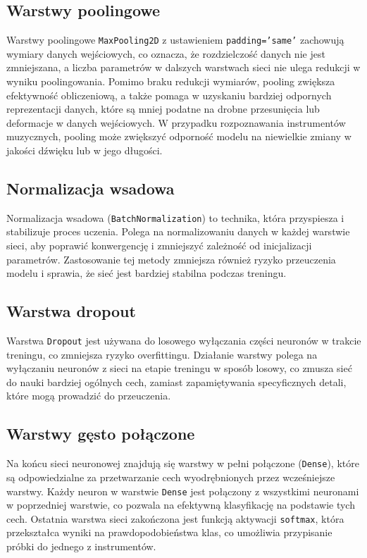 \documentclass{SGGW-thesis}
\begin{document}
\subsection{Warstwy poolingowe}
Warstwy poolingowe \texttt{MaxPooling2D} z ustawieniem \texttt{padding='same'} zachowują wymiary danych wejściowych, co oznacza, że rozdzielczość danych nie jest zmniejszana, a liczba parametrów w dalszych warstwach sieci nie ulega redukcji w wyniku poolingowania. Pomimo braku redukcji wymiarów, pooling zwiększa efektywność obliczeniową, a także pomaga w uzyskaniu bardziej odpornych reprezentacji danych, które są mniej podatne na drobne przesunięcia lub deformacje w danych wejściowych. W przypadku rozpoznawania instrumentów muzycznych, pooling może zwiększyć odporność modelu na niewielkie zmiany w jakości dźwięku lub w jego długości.

\subsection{Normalizacja wsadowa}
Normalizacja wsadowa (\texttt{BatchNormalization}) to technika, która przyspiesza i stabilizuje proces uczenia. Polega na normalizowaniu danych w każdej warstwie sieci, aby poprawić konwergencję i zmniejszyć zależność od inicjalizacji parametrów. Zastosowanie tej metody zmniejsza również ryzyko przeuczenia modelu i sprawia, że sieć jest bardziej stabilna podczas treningu.

\subsection{Warstwa dropout}
Warstwa \texttt{Dropout} jest używana do losowego wyłączania części neuronów w trakcie treningu, co zmniejsza ryzyko overfittingu. Działanie warstwy polega na wyłączaniu neuronów z sieci na etapie treningu w sposób losowy, co zmusza sieć do nauki bardziej ogólnych cech, zamiast zapamiętywania specyficznych detali, które mogą prowadzić do przeuczenia.

\subsection{Warstwy gęsto połączone}
Na końcu sieci neuronowej znajdują się warstwy w pełni połączone (\texttt{Dense}), które są odpowiedzialne za przetwarzanie cech wyodrębnionych przez wcześniejsze warstwy. Każdy neuron w warstwie \texttt{Dense} jest połączony z wszystkimi neuronami w poprzedniej warstwie, co pozwala na efektywną klasyfikację na podstawie tych cech. Ostatnia warstwa sieci zakończona jest funkcją aktywacji \texttt{softmax}, która przekształca wyniki na prawdopodobieństwa klas, co umożliwia przypisanie próbki do jednego z instrumentów.
\end{document}
